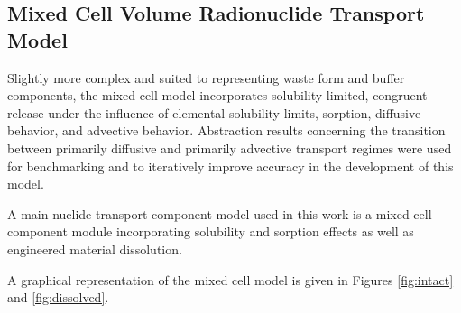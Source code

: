 \subsection*{Mixed Cell Volume Radionuclide Transport Model}\label{sec:mixed_cell}
Slightly more complex and suited to representing waste form and buffer 
components, the mixed cell model incorporates solubility limited, congruent 
release under the influence of elemental solubility limits, sorption, diffusive 
behavior, and advective behavior. Abstraction results concerning the 
transition between primarily diffusive and primarily advective transport regimes 
were used for benchmarking and to iteratively improve accuracy in the development 
of this model.

A main nuclide transport component model used in this work is a mixed cell 
component module incorporating solubility and sorption effects as well as  
engineered material dissolution.

A graphical representation of the mixed cell model is given in Figures 
\ref{fig:intact} and \ref{fig:dissolved}.  

